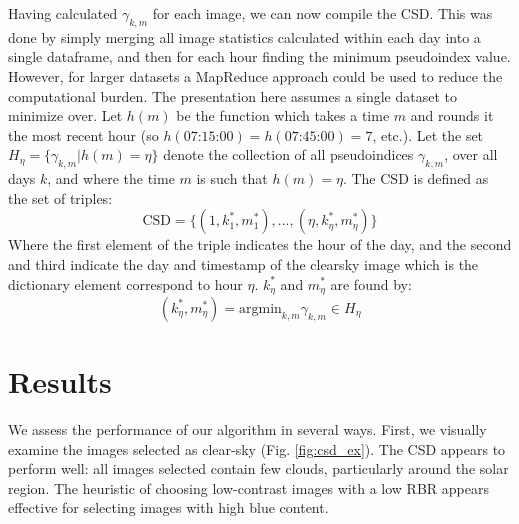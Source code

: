 \documentclass{article}
\begin{document}
Having calculated $\gamma_{k,m}$ for each image, we can now compile the CSD. This was done by simply merging all image statistics calculated within each day into a single dataframe, and then for each hour finding the minimum pseudoindex value. However, for larger datasets a MapReduce approach could be used to reduce the computational burden. The presentation here assumes a single dataset to minimize over.    
Let $h(m)$ be the function which takes a time $m$ and rounds it the most recent hour (so $h(\text{07:15:00}) = h(\text{07:45:00}) = 7$, etc.). 
Let the set $H_{\eta} = \{ \gamma_{k,m} | h(m) = \eta \}$ denote the collection of all pseudoindices $\gamma_{k,m}$, over all days $k$, and where the time $m$ is such that $h(m) = \eta$. The CSD is defined as the set of triples:
\[
\text{CSD} = \{(1,k_1^*,m_1^*),...,(\eta,k_{\eta}^*,m_{\eta}^*)\}
\]
Where the first element of the triple indicates the hour of the day, and the second and third indicate the day and timestamp of the clearsky image which is the dictionary element correspond to hour $\eta$. $k_{\eta}^*$ and $m_{\eta}^*$ are found by:    
\[
(k_{\eta}^*,m_{\eta}^*) = \text{argmin}_{k,m} \gamma_{k,m} \in H_{\eta}
\]

\section{Results}
We assess the performance of our algorithm in several ways. First, we visually examine the images selected as clear-sky (Fig. \ref{fig:csd_ex}). The CSD appears to perform well: all images selected contain few clouds, particularly around the solar region. The heuristic of choosing low-contrast images with a low RBR appears effective for selecting images with high blue content. 
\end{document}
